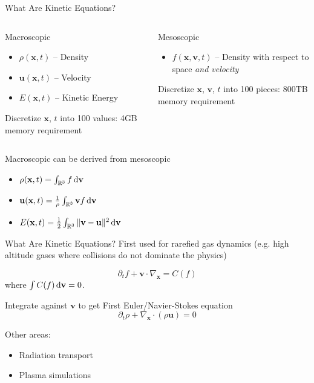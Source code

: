 \documentclass{beamer}
\renewcommand{\vec}[1]{\ensuremath{\mathbf{#1}}}
\newcommand{\R}{\ensuremath{\mathbb{R}}\xspace}
\begin{document}
    \begin{frame}{What Are Kinetic Equations?}
        \begin{columns}[t]
            \begin{block}{Macroscopic}
                \begin{itemize}
                    \item $\rho(\vec{x},t)$ -- Density
                    \item $\vec{u}(\vec{x},t)$ -- Velocity
                    \item $E(\vec{x},t)$ -- Kinetic Energy
                \end{itemize}
                Discretize \vec{x}, $t$ into 100 values: 4GB memory requirement
            \end{block}
            \begin{block}{Mesoscopic}
                \begin{itemize}
                    \item $f(\vec{x},\vec{v},t)$ -- Density with respect to space \emph{and velocity}
                \end{itemize}
                Discretize \vec{x}, \vec{v}, $t$ into 100 pieces: 800TB memory requirement
            \end{block}
        \end{columns}

        \vfill

        Macroscopic can be derived from mesoscopic
        \begin{itemize}
            \item $\rho(\vec{x},t) = \int_{\R^3} f \dif \vec{v}$
            \item $\vec{u}(\vec{x},t) = \frac{1}{\rho} \int_{\R^3} \vec{v}f \dif \vec{v}$
            \item $E(\vec{x},t) = \frac{1}{2} \int_{\R^3} \| \vec{v} - \vec{u} \|^2 \dif \vec{v}$
        \end{itemize}
    \end{frame}

    \begin{frame}{What Are Kinetic Equations?}
        First used for rarefied gas dynamics (e.g. high altitude gases where collisions do not dominate the physics)

        \[\partial_t f + \vec{v} \cdot \nabla_\vec{x} = C(f)\]
        where $\int C(f) \dif \vec{v} = 0$.

        \vfill

        Integrate against \vec{v} to get First Euler/Navier-Stokes equation
        \[\partial_t \rho + \nabla_{\vec{x}} \cdot (\rho \vec{u}) = 0\]

        \vfill

        Other areas:
        \begin{itemize}
            \item Radiation transport
            \item Plasma simulations
        \end{itemize}
    \end{frame}
\end{document}
